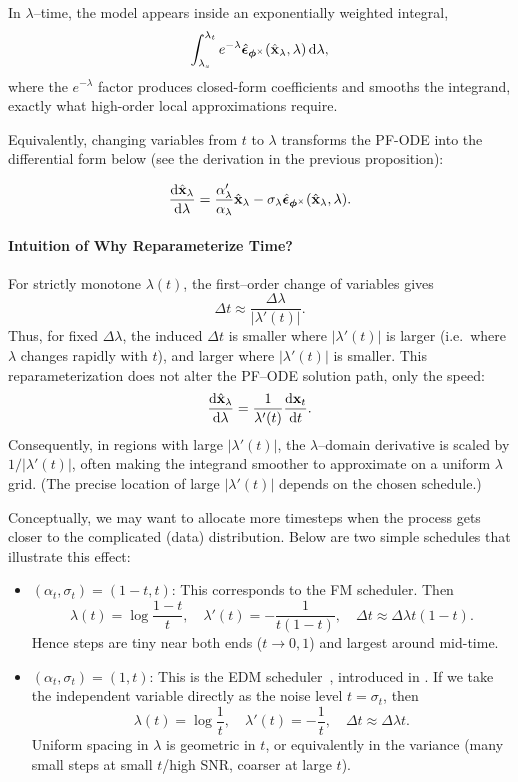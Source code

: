 In $\lambda$–time, the model appears inside an exponentially weighted integral,
\[
\int_{\lambda_s}^{\lambda_t} e^{-\lambda} \hat{\bm{\epsilon}}_{\bm{\phi}^\times}(\hat{{\mathbf{x}}}_\lambda,\lambda) \mathop{}\!\mathrm{d} \lambda,
\]
where the $e^{-\lambda}$ factor produces closed-form coefficients and smooths the integrand, exactly what high-order local approximations require.

Equivalently, changing variables from $t$ to $\lambda$ transforms the PF-ODE into the differential form below (see the derivation in the previous proposition):
\begin{mdframed}
\begin{align}\label{eq:diffusion_ode_lambda_eps}
\frac{\mathop{}\!\mathrm{d} \hat{{\mathbf{x}}}_\lambda}{\mathop{}\!\mathrm{d} \lambda}
= \frac{\alpha_\lambda'}{\alpha_\lambda} \hat{{\mathbf{x}}}_\lambda
- \sigma_\lambda \hat{\bm{\epsilon}}_{\bm{\phi}^\times}(\hat{{\mathbf{x}}}_\lambda, \lambda).
\end{align}
\end{mdframed}


\paragraph{Intuition of Why Reparameterize Time?}
For strictly monotone $\lambda(t)$, the first–order change of variables gives
\[
\Delta t  \approx  \frac{\Delta\lambda}{ |\lambda'(t)| }.
\]
Thus, for fixed $\Delta\lambda$, the induced $\Delta t$ is smaller where $|\lambda'(t)|$ is larger (i.e.\ where $\lambda$ changes rapidly with $t$), and larger where $|\lambda'(t)|$ is smaller. 
This reparameterization does not alter the PF–ODE solution path, only the speed:
\[
\frac{\mathop{}\!\mathrm{d} \hat{{\mathbf{x}}}_\lambda}{\mathop{}\!\mathrm{d} \lambda}
= \frac{1}{\lambda'(t)} \frac{\mathop{}\!\mathrm{d} {\mathbf{x}}_t}{\mathop{}\!\mathrm{d} t}.
\]
Consequently, in regions with large $|\lambda'(t)|$, the $\lambda$–domain derivative is scaled by $1/|\lambda'(t)|$, often making the integrand smoother to approximate on a uniform $\lambda$ grid. 
(The precise location of large $|\lambda'(t)|$ depends on the chosen schedule.) 

Conceptually, we may want to allocate more timesteps when the process gets closer to the complicated (data) distribution. Below are two simple schedules that illustrate this effect:
\begin{itemize}
\item $(\alpha_t,\sigma_t)=(1-t, t)$: This corresponds to the FM scheduler. Then
\[
\lambda(t)=\log\frac{1-t}{t},\quad 
\lambda'(t)=-\frac{1}{t(1-t)},\quad
\Delta t \approx \Delta\lambda   t(1-t).
\]
Hence steps are tiny near both ends ($t\to 0,1$) and largest around mid-time.

\item $(\alpha_t,\sigma_t)=(1, t)$: This is the EDM scheduler~\citep{karras2022elucidating}, introduced in . If we take the independent variable directly as the noise level $t=\sigma_t$, then
\[
\lambda(t)=\log\frac{1}{t},\quad 
\lambda'(t)=-\frac{1}{t},\quad
\Delta t \approx \Delta\lambda   t.
\]
Uniform spacing in $\lambda$ is geometric in $t$, or equivalently in the variance (many small steps at small $t$/high SNR, coarser at large $t$).
\end{itemize}




